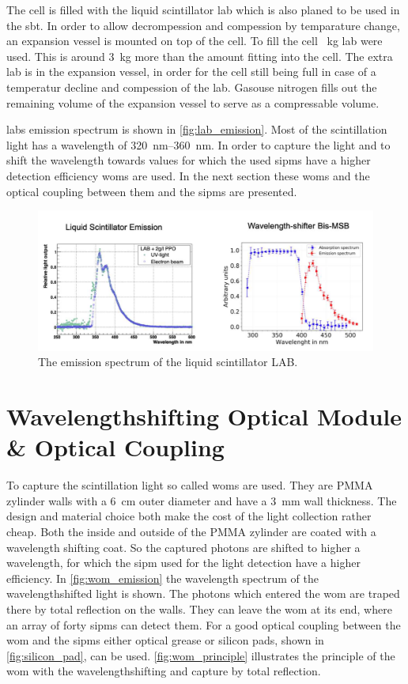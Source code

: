 The cell is filled with the liquid scintillator \ac{lab} which is also planed to be used in the \ac{sbt}.
In order to allow decrompession and compession by temparature change, an expansion vessel is mounted on top of the cell.
To fill the cell \SI{}{\kilo\gram} \ac{lab} were used.
This is around \SI{3}{\kilo\gram} more than the amount fitting into the cell.
The extra \ac{lab} is in the expansion vessel, in order for the cell still being full in case of a temperatur decline and compession of the \ac{lab}.
Gasouse nitrogen fills out the remaining volume of the expansion vessel to serve as a compressable volume. 

\ac{lab}s emission spectrum is shown in \autoref{fig:lab_emission}.
Most of the scintillation light has a wavelength of \SIrange{320}{360}{\nano\meter}.
In order to capture the light and to shift the wavelength towards values for which the used \acp{sipm} have a higher detection efficiency \acp{wom} are used.
In the next section these \acp{wom} and the optical coupling between them and the \acp{sipm} are presented.
\begin{figure}
	\centering
	\includegraphics[width=1.\textwidth]{pictures/lab_emission}
	\caption[LAB emission spectrum]{The emission spectrum of the liquid scintillator LAB.}
\end{figure}



\section{Wavelengthshifting Optical Module \& Optical Coupling}

To capture the scintillation light so called \acp{wom} are used.
They are PMMA zylinder walls with a \SI{6}{\centi\meter} outer diameter and have a \SI{3}{\milli\meter} wall thickness.
The design and material choice both make the cost of the light collection rather cheap.
Both the inside and outside of the PMMA zylinder are coated with a wavelength shifting coat.
So the captured photons are shifted to higher a wavelength, for which the \ac{sipm} used for the light detection have a higher efficiency.
In \autoref{fig:wom_emission} the wavelength spectrum of the wavelengthshifted light is shown.
The photons which entered the \ac{wom} are traped there by total reflection on the walls.
They can leave the \ac{wom} at its end, where an array of forty \acp{sipm} can detect them.
For a good optical coupling between the \ac{wom} and the \acp{sipm} either optical grease or silicon pads, shown in \autoref{fig:silicon_pad}, can be used.
\autoref{fig:wom_principle} illustrates the principle of the \ac{wom} with the wavelengthshifting and capture by total reflection.

